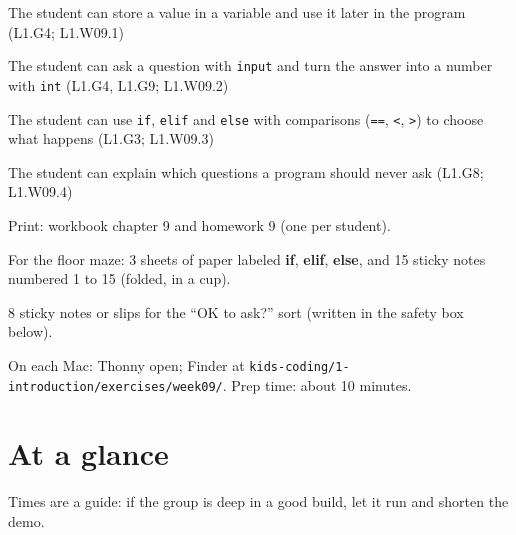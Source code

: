 
\begin{objectives}
  \item The student can store a value in a variable and use it later in the program (L1.G4; L1.W09.1)
  \item The student can ask a question with \texttt{input} and turn the answer into a number with \texttt{int} (L1.G4, L1.G9; L1.W09.2)
  \item The student can use \texttt{if}, \texttt{elif} and \texttt{else} with comparisons (\texttt{==}, \texttt{<}, \texttt{>}) to choose what happens (L1.G3; L1.W09.3)
  \item The student can explain which questions a program should never ask (L1.G8; L1.W09.4)
\end{objectives}

\begin{materials}
  \item Print: workbook chapter 9 and homework 9 (one per student).
  \item For the floor maze: 3 sheets of paper labeled \textbf{if}, \textbf{elif}, \textbf{else}, and 15 sticky notes numbered 1 to 15 (folded, in a cup).
  \item 8 sticky notes or slips for the \enquote{OK to ask?} sort (written in the safety box below).
  \item On each Mac: Thonny open; Finder at \texttt{kids-coding/1-introduction/exercises/week09/}. Prep time: about 10 minutes.
\end{materials}

\section{At a glance}
Times are a guide: if the group is deep in a good build, let it run and shorten the demo.
\begin{timeplan}
\end{timeplan}

